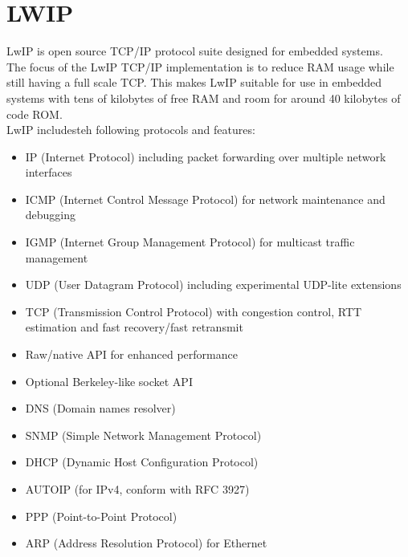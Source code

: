 \chapter{LWIP}
LwIP is open source TCP/IP protocol suite designed for embedded systems.\\
The focus of the LwIP TCP/IP implementation is to reduce RAM usage while still
having a full scale TCP. This makes LwIP
suitable for use in embedded systems with tens of kilobytes of free RAM and room
for around 40 kilobytes of code ROM.\\
LwIP includesteh following protocols and features:\citep{lwip-16}\\
\begin{itemize}
	\item IP (Internet Protocol) including packet forwarding over multiple network interfaces
  \item ICMP (Internet Control Message Protocol) for network maintenance and debugging
  \item IGMP (Internet Group Management Protocol) for multicast traffic management
  \item UDP (User Datagram Protocol) including experimental UDP-lite extensions
  \item TCP (Transmission Control Protocol) with congestion control, RTT estimation and fast recovery/fast retransmit
  \item Raw/native API for enhanced performance
  \item Optional Berkeley-like socket API
  \item DNS (Domain names resolver)
  \item SNMP (Simple Network Management Protocol)
  \item DHCP (Dynamic Host Configuration Protocol)
  \item AUTOIP (for IPv4, conform with RFC 3927)
  \item PPP (Point-to-Point Protocol)
  \item ARP (Address Resolution Protocol) for Ethernet 
\end{itemize}



